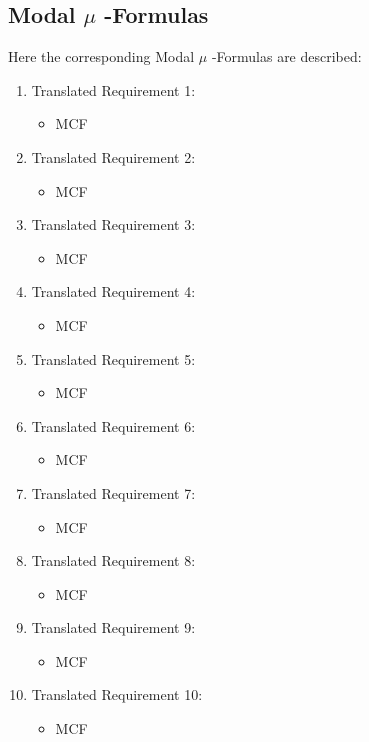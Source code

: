 \documentclass[a4paper,12pt]{article}
\begin{document}
\subsection{Modal $\mu$ -Formulas}
Here the corresponding Modal $\mu$ -Formulas are described:
\begin{enumerate}
\item Translated Requirement 1:
    \begin{itemize}
	\item MCF
	\end{itemize}
\item Translated Requirement 2:
    \begin{itemize}
	\item MCF
	\end{itemize}
\item Translated Requirement 3:
    \begin{itemize}
	\item MCF
	\end{itemize}
\item Translated Requirement 4:
    \begin{itemize}
	\item MCF
	\end{itemize}
\item Translated Requirement 5:
    \begin{itemize}
	\item MCF
	\end{itemize}
\item Translated Requirement 6:
    \begin{itemize}
	\item MCF
	\end{itemize}
\item Translated Requirement 7:
    \begin{itemize}
	\item MCF
	\end{itemize}
\item Translated Requirement 8:
    \begin{itemize}
	\item MCF
	\end{itemize}
\item Translated Requirement 9:
    \begin{itemize}
	\item MCF
	\end{itemize}
\item Translated Requirement 10:
    \begin{itemize}
	\item MCF
	\end{itemize}
\end{enumerate}
\newpage
\end{document}
